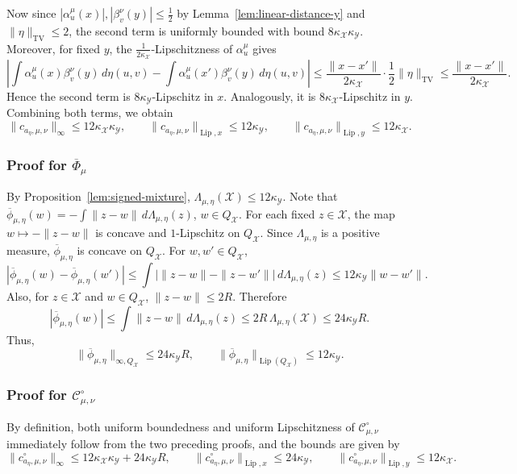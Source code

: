 \documentclass[11pt]{amsart}
\theoremstyle{definition}
\theoremstyle{remark}
\newcommand{\1}{\mathbf{1}}
\newcommand{\Lip}{\operatorname{Lip}}
\numberwithin{equation}{section}
\newcommand{\TV}{\mathrm{TV}}
\begin{document}
Now since $|\alpha_u^\mu(x)|, |\beta_v^\nu(y)| \leq \frac{1}{2}$ by
Lemma~\ref{lem:linear-distance-y} and $\|\eta\|_{\TV}\leq 2$, the
second term is uniformly bounded with bound
$8\kappa_\mathcal{X}\kappa_\mathcal{Y}$. Moreover, for fixed $y$, the
$\frac{1}{2\kappa_\mathcal{X}}$-Lipschitzness of $\alpha_u^\mu$ gives
\[
\left|\int \alpha_u^\mu(x)\beta_v^\nu(y)\,d\eta(u,v)
-
\int \alpha_u^\mu(x')\beta_v^\nu(y)\,d\eta(u,v)\right|
\le
\frac{\|x-x'\|}{2\kappa_\mathcal{X}}\cdot \frac12 \|\eta\|_{\TV}
\le
\frac{\|x-x'\|}{2\kappa_\mathcal{X}}.
\]
Hence the second term is $8\kappa_\mathcal{Y}$-Lipschitz in $x$.
Analogously, it is $8\kappa_\mathcal{X}$-Lipschitz in $y$. Combining both
terms, we obtain
\[
\|c_{a_\eta,\mu,\nu}\|_\infty\le 12\kappa_\mathcal{X}\kappa_\mathcal{Y},\qquad
\|c_{a_\eta,\mu,\nu}\|_{\Lip,x}\le 12\kappa_\mathcal{Y},\qquad
\|c_{a_\eta,\mu,\nu}\|_{\Lip,y}\le 12\kappa_\mathcal{X}.
\]

\subsubsection*{Proof for $\overline\Phi_{\mu}$}
By
Proposition~\ref{lem:signed-mixture},
$\Lambda_{\mu,\eta}(\mathcal X)\le 12\kappa_{\mathcal Y}$. Note that 
$\overline{\phi}_{\mu,\eta}(w)=
-\int \|z-w\|\,d\Lambda_{\mu,\eta}(z)$, $w\in Q_\mathcal{X}$. For each fixed $z\in \mathcal X$, the map
$w\mapsto -\|z-w\|$ is concave and $1$-Lipschitz on $Q_{\mathcal X}$. Since
$\Lambda_{\mu,\eta}$ is a positive measure, $\overline{\phi}_{\mu,\eta}$ is
concave on $Q_{\mathcal X}$. For $w,w'\in Q_{\mathcal X}$,
\[
|\overline{\phi}_{\mu,\eta}(w)-\overline{\phi}_{\mu,\eta}(w')|
\le
\int \bigl|\|z-w\|-\|z-w'\|\bigr|\,d\Lambda_{\mu,\eta}(z)
\le
12\kappa_{\mathcal Y}\|w-w'\|.
\]
Also, for $z\in \mathcal X$ and $w\in Q_{\mathcal X}$, $\|z-w\|\le 2R$.
Therefore
\[
|\overline{\phi}_{\mu,\eta}(w)|
\le
\int \|z-w\|\,d\Lambda_{\mu,\eta}(z)
\le
2R\,\Lambda_{\mu,\eta}(\mathcal X)
\le
24\kappa_{\mathcal Y}R.
\]
Thus,
\[
\|\overline{\phi}_{\mu,\eta}\|_{\infty,Q_{\mathcal X}}
\le 24\kappa_{\mathcal Y}R,
\qquad
\|\overline{\phi}_{\mu,\eta}\|_{\Lip(Q_{\mathcal X})}
\le 12\kappa_{\mathcal Y}.
\]

\subsubsection*{Proof for $\mathcal C^\circ_{\mu,\nu}$}
By definition, both uniform boundedness and uniform Lipschitzness of
$\mathcal C^\circ_{\mu,\nu}$ immediately follow from the two preceding proofs, and the bounds are given by
\[
\|c^\circ_{a_\eta,\mu,\nu}\|_{\infty}
\le
12\kappa_{\mathcal X}\kappa_{\mathcal Y}
+
24\kappa_{\mathcal Y}R,
\qquad
\|c^\circ_{a_\eta,\mu,\nu}\|_{\Lip,x}
\le
24\kappa_{\mathcal Y},
\qquad
\|c^\circ_{a_\eta,\mu,\nu}\|_{\Lip,y}
\le
12\kappa_{\mathcal X}.
\]
\end{document}
